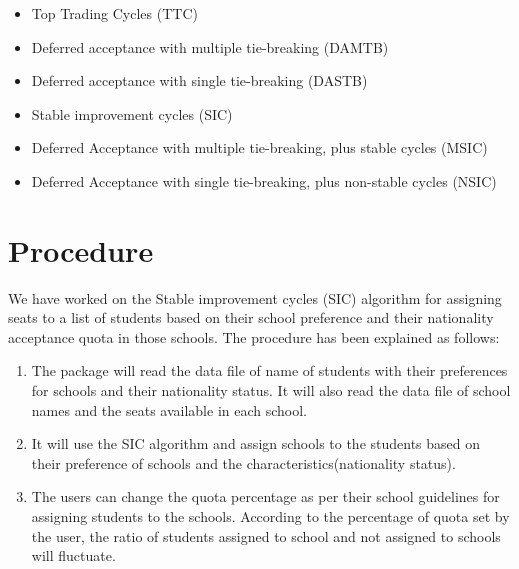 \documentclass[twocolumn]{bmcart}
\begin{document}
		\begin{sloppypar}
			\begin{itemize}
				\vspace{-0.4cm}\item Top Trading Cycles (TTC) \vspace{\baselineskip}
				\vspace{-0.4cm}\item Deferred acceptance with multiple tie-breaking (DAMTB) \vspace{\baselineskip}
				\vspace{-0.4cm}\item Deferred acceptance with single tie-breaking (DASTB) \vspace{\baselineskip}
				\vspace{-0.4cm}\item Stable improvement cycles (SIC) \vspace{\baselineskip}
				\vspace{-0.4cm}\item Deferred Acceptance with multiple tie-breaking, plus stable cycles (MSIC) \vspace{\baselineskip}
				\vspace{-0.4cm}\item Deferred Acceptance with single tie-breaking, plus non-stable cycles (NSIC)
			\end{itemize}
		\end{sloppypar}
		\section*{Procedure}
		\vspace{\baselineskip}
		We have worked on the Stable improvement cycles (SIC) algorithm for assigning seats to a list of students based on their school preference and their nationality acceptance quota in those schools. The procedure has been explained as follows: \vspace{\baselineskip}
		\vspace{\baselineskip}
		\begin{enumerate}
			\vspace{-0.4cm}\item The package will read the data file of name of students with their preferences for schools and their nationality status. It will also read the data file of school names and the seats available in each school. \vspace{\baselineskip}
			\vspace{-0.4cm}\item It will use the SIC algorithm and assign schools to the students based on their preference of schools and the characteristics(nationality status). \vspace{\baselineskip}
			\vspace{-0.4cm}\item The users can change the quota percentage as per their school guidelines for assigning students to the schools. According to the percentage of quota set by the user, the ratio of students assigned to school and not assigned to schools will fluctuate. \vspace{\baselineskip}
		\end{enumerate}
		
\end{document}
